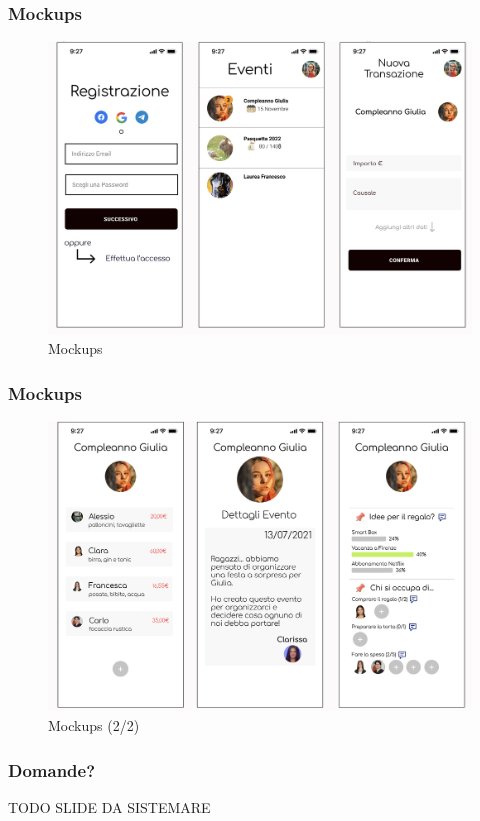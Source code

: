\documentclass[11pt]{beamer}
\begin{document}
	\begin{frame}
		\frametitle{Mockups}
		\begin{figure}[h]
			\centering
			\includegraphics[scale=0.2]{mock.png}
			\caption{Mockups}
		\end{figure}
	\end{frame}

	\begin{frame}
		\frametitle{Mockups}
		\begin{figure}[h]
			\centering
			\includegraphics[scale=0.2]{mock2.png}
			\caption{Mockups (2/2)}
		\end{figure}
	\end{frame}

	\begin{frame}
		\frametitle{Domande?}
		TODO SLIDE DA SISTEMARE 
	\end{frame}
\end{document}
